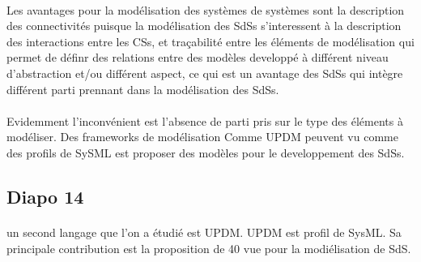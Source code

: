\paragraph{} Les avantages pour la modélisation des systèmes de
systèmes sont la description des connectivités puisque la modélisation
des SdSs s'interessent à la description des interactions entre les
CSs, et traçabilité entre les éléments de modélisation qui permet
de définr des relations entre des modèles developpé à différent niveau
d'abstraction et/ou différent aspect, ce qui est un avantage des SdSs
qui intègre différent parti prennant dans la modélisation des SdSs. 

\paragraph{} Evidemment l'inconvénient est l'absence de parti pris
sur le type des éléments à modéliser. Des frameworks de modélisation
Comme UPDM peuvent vu comme des profils de SySML est proposer des
modèles pour le developpement des SdSs. 

\subsection{Diapo 14} 
\paragraph{}
un second langage que l'on a étudié est UPDM. UPDM est profil de
SysML. Sa principale contribution est la proposition de 40 vue pour la
modiélisation de SdS. 

